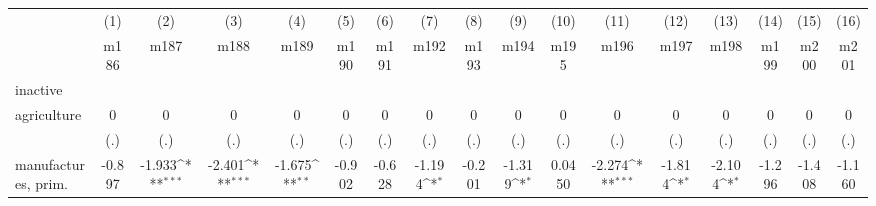 {
\def\sym#1{\ifmmode^{#1}\else\(^{#1}\)\fi}
\begin{tabular}{l*{16}{c}}
\hline\hline
                    &\multicolumn{1}{c}{(1)}&\multicolumn{1}{c}{(2)}&\multicolumn{1}{c}{(3)}&\multicolumn{1}{c}{(4)}&\multicolumn{1}{c}{(5)}&\multicolumn{1}{c}{(6)}&\multicolumn{1}{c}{(7)}&\multicolumn{1}{c}{(8)}&\multicolumn{1}{c}{(9)}&\multicolumn{1}{c}{(10)}&\multicolumn{1}{c}{(11)}&\multicolumn{1}{c}{(12)}&\multicolumn{1}{c}{(13)}&\multicolumn{1}{c}{(14)}&\multicolumn{1}{c}{(15)}&\multicolumn{1}{c}{(16)}\\
                    &\multicolumn{1}{c}{m186}&\multicolumn{1}{c}{m187}&\multicolumn{1}{c}{m188}&\multicolumn{1}{c}{m189}&\multicolumn{1}{c}{m190}&\multicolumn{1}{c}{m191}&\multicolumn{1}{c}{m192}&\multicolumn{1}{c}{m193}&\multicolumn{1}{c}{m194}&\multicolumn{1}{c}{m195}&\multicolumn{1}{c}{m196}&\multicolumn{1}{c}{m197}&\multicolumn{1}{c}{m198}&\multicolumn{1}{c}{m199}&\multicolumn{1}{c}{m200}&\multicolumn{1}{c}{m201}\\
\hline
inactive            &                     &                     &                     &                     &                     &                     &                     &                     &                     &                     &                     &                     &                     &                     &                     &                     \\
agriculture         &           0         &           0         &           0         &           0         &           0         &           0         &           0         &           0         &           0         &           0         &           0         &           0         &           0         &           0         &           0         &           0         \\
                    &         (.)         &         (.)         &         (.)         &         (.)         &         (.)         &         (.)         &         (.)         &         (.)         &         (.)         &         (.)         &         (.)         &         (.)         &         (.)         &         (.)         &         (.)         &         (.)         \\
[1em]
manufactures, prim. &      -0.897         &      -1.933\sym{***}&      -2.401\sym{***}&      -1.675\sym{**} &      -0.902         &      -0.628         &      -1.194\sym{*}  &      -0.201         &      -1.319\sym{*}  &      0.0450         &      -2.274\sym{***}&      -1.814\sym{*}  &      -2.104\sym{*}  &      -1.296         &      -1.408         &      -1.160         \\

\end{tabular}}

